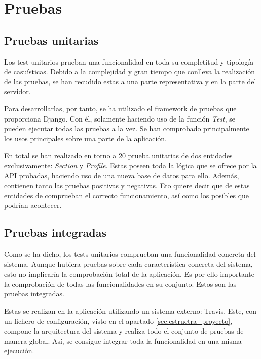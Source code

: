 
\chapter{Pruebas}\label{pruebas}
\section{Pruebas unitarias}\label{sec:pruebas_unitarias}

Los test unitarios prueban una funcionalidad en toda su completitud y tipología de casuísticas. Debido a la complejidad y gran tiempo que conlleva la realización de las pruebas, se han recudido estas a una parte representativa y en la parte del servidor.

Para desarrollarlas, por tanto, se ha utilizado el framework de pruebas que proporciona Django. Con él, solamente haciendo uso de la función \textit{Test}, se pueden ejecutar todas las pruebas a la vez. Se han comprobado principalmente los usos principales sobre una parte de la aplicación.

En total se han realizado en torno a 20 prueba unitarias de dos entidades exclusivamente: \textit{Section} y \textit{Profile}. Estas poseen toda la lógica que se ofrece por la API probadas, haciendo uso de una nueva base de datos para ello. Además, contienen tanto las pruebas positivas y negativas. Eto quiere decir que de estas entidades de comprueban el correcto funcionamiento, así como los posibles que podrían acontecer.

\section{Pruebas integradas}\label{sec:pruebas_integradas}

Como se ha dicho, los tests unitarios comprueban una funcionalidad concreta del sistema. Aunque hubiera pruebas sobre cada característica concreta del sistema, esto no implicaría la comprobación total de la aplicación. Es por ello importante la comprobación de todas las funcionalidades en su conjunto. Estos son las pruebas integradas.

Estas se realizan en la aplicación utilizando un sistema externo: Travis. Este, con un fichero de configuración, visto en el apartado \ref{sec:estructra_proyecto}, compone la arquitectura del sistema y realiza todo el conjunto de pruebas de manera global. Así, se consigue integrar toda la funcionalidad en una misma ejecución.

